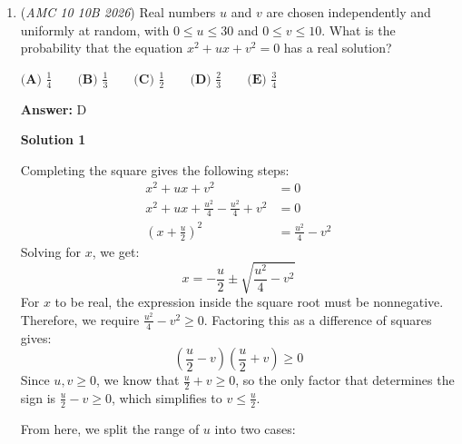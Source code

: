 \begin{enumerate}
 



\textbf{Solution 8(basically 5)}

Since $2^r + 2^s = 7$, So 
 \[(2^r + 2^s)^2 = 49\] and it can be expanded into 
 \[2^2r + 2(2^{r+s}) + 2^2s = 49\] since we know that $r + s = 2$, then 
 \[2^{2r} + 2^{2s} = 41\] Now multiply it by $2^r+2^s$, which will give 
 \[(2^2r + 2^2s)(2^r+2^s) = 287\] and expanding this one last time 
 \[8^r + 2^{2r+s} + 2^{2s+r} + 8^s = 289\] We have what the question is asking now, only with the extra $2^{2r+s} + 2^{2s+r}$, which can be simplified to $2^{2+s} + 2^{2+s}$, and expanding it to $4 \cdot (2^r + 2^s)$, which equates to $28$, now $287 - 28 = \boxed{\textbf{(E) } 259}.$



	\item (\textit{AMC 10 10B 2026}) Real numbers $u$ and $v$ are chosen independently and uniformly at random, with $0\leq u\leq 30$ and $0\leq v\leq 10.$ What is the probability that the equation $x^2+ux+v^2=0$ has a real solution?


 $\textbf{(A) } \frac{1}{4} \qquad \textbf{(B) } \frac{1}{3} \qquad \textbf{(C) } \frac{1}{2} \qquad \textbf{(D) } \frac{2}{3} \qquad \textbf{(E) } \frac{3}{4}$

 \textbf{Answer: }D



\textbf{Solution 1}

Completing the square gives the following steps:
 \begin{align} x^2 + ux + v^2 &= 0 \\ x^2 + ux + \frac{u^2}{4} - \frac{u^2}{4} + v^2 &= 0 \\ \left(x + \frac{u}{2}\right)^2 &= \frac{u^2}{4} - v^2 \end{align}Solving for $x$, we get:
 \[x = -\frac{u}{2} \pm \sqrt{\frac{u^2}{4} - v^2}\]For $x$ to be real, the expression inside the square root must be nonnegative. Therefore, we require $\frac{u^2}{4} - v^2 \geq 0$. Factoring this as a difference of squares gives:
 \[\left(\frac{u}{2} - v\right)\left(\frac{u}{2} + v\right) \geq 0\]Since $u, v \geq 0$, we know that $\frac{u}{2} + v \geq 0$, so the only factor that determines the sign is $\frac{u}{2} - v \geq 0$, which simplifies to $v \leq \frac{u}{2}$.

 From here, we split the range of $u$ into two cases:


\end{enumerate}
